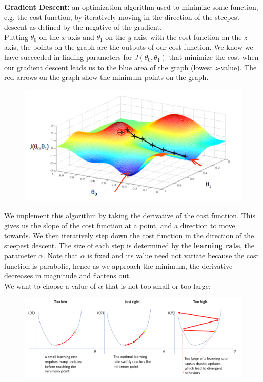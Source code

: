 \documentclass{article}
\begin{document}
        \noindent \textbf{Gradient Descent:} an optimization algorithm used to minimize some function, e.g. the
        cost function, by iteratively moving in the direction of the steepest descent as defined by the negative
        of the gradient. \\

        \noindent Putting $\theta_0$ on the $x$-axis and $\theta_1$ on the $y$-axis, with the cost function
        on the $z$-axis, the points on the graph are the outputs of our cost function. We know we have succeeded
        in finding parameters for $J(\theta_0,\theta_1)$ that minimize the cost when our gradient descent leads
        us to the blue area of the graph (lowest $z$-value). The red arrows on the graph show the minimum points
        on the graph.

        \begin{figure}[hbt!]
            \centering
            \includegraphics[scale=0.75]{Resources/Gradient_Descent}
        \end{figure}

        \noindent We implement this algorithm by taking the derivative of the cost function. This gives us the
        slope of the cost function at a point, and a direction to move towards. We then iteratively step down
        the cost function in the direction of the steepest descent. The size of each step is determined by the
        \textbf{learning rate}, the parameter $\alpha$. Note that $\alpha$ is fixed and its value need not variate
        because the cost function is parabolic, hence as we approach the minimum, the derivative decreases in
        magnitude and flattens out. \\

        \noindent We want to choose a value of $\alpha$ that is not too small or too large:

        \begin{figure}[hbt!]
            \centering
            \includegraphics[scale=0.5]{Resources/Learning_Rate.PNG}
        \end{figure}
\end{document}
